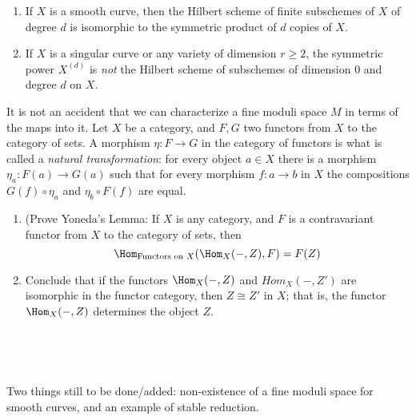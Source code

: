 \begin{exercise}\label{symmetric power vs Hilbert scheme}
\begin{enumerate}
 \item If $X$ is a smooth curve, then the Hilbert scheme of finite subschemes of $X$ of degree $d$ is
 isomorphic to the symmetric product of $d$ copies of $X$.
 \item If $X$ is a singular curve or any variety of dimension $r \geq 2$, the symmetric power $X^{(d)}$ is \emph{not} the Hilbert scheme of subschemes of dimension 0 and degree $d$ on $X$. 
 
\end{enumerate}
 \end{exercise}


\begin{exercise}
It is not an accident that we can characterize a fine moduli space $M$ in terms of the maps into it. 
 Let $X$ be a category, and $F,G$ two functors from $X$ to the category of sets.
 A morphism $\eta: F\to G$ in the category of functors is what is called a \emph{natural transformation}:
 for every object $a\in X$ there is a morphism $\eta_a:F(a) \to G(a)$ such that for every
 morphism $f: a\to b$ in $X$ the compositions $G(f)\circ \eta_a$ and $\eta_b\circ F(f)$
 are equal. 
\begin{enumerate}
 \item (Prove Yoneda's Lemma: If $X$ is any category, and $F$ is a contravariant functor from $X$ to the category of sets, then 
 $$
 \Hom_{\hbox{\scriptsize Functors on $X$}}(\Hom_X( -, Z), F) = F(Z)
 $$
 \item Conclude that if the functors $\Hom_X( -, Z)$ and $Hom_X( -, Z')$ are isomorphic in the functor category, 
 then $Z \cong Z'$ in $X$; that is, the functor $\Hom_X( -, Z)$ determines the object $Z$.
 \end{enumerate}
\end{exercise}

\

\

Two things still to be done/added: non-existence of a fine moduli space for smooth curves, and an example of stable reduction.

